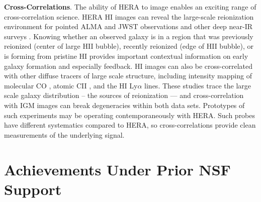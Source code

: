 \documentclass[preprint]{aastex}
\newcommand{\Mycitep}[1]{{\bf \citep{#1}}}
\newcommand{\compress}{\vspace{-0.25in}}
\begin{document}
{\bf Cross-Correlations}. The ability of HERA to image enables an exciting range of cross-correlation science.
HERA HI images can reveal the large-scale reionization environment for pointed ALMA and JWST
observations and other deep near-IR surveys \Mycitep{lidz_et_al2009}.
Knowing whether an observed galaxy is in a region that  was
previously reionized (center of large HII bubble), recently reionized (edge of HII bubble), or is forming from
pristine HI provides important contextual information on early galaxy formation and especially feedback.
HI images can also be cross-correlated with other diffuse
tracers of large scale structure, including intensity
mapping of molecular  CO \Mycitep{lidz_et_al2011}, atomic CII \citep{gong_et_al2011}, and the HI Ly$\alpha$ \citep{silva_et_al2013,wiersma_et_al2013} lines. These studies
trace the large scale galaxy distribution -- the sources of reionization — and cross-correlation 
with IGM images can break degeneracies within both data sets. Prototypes of such experiments
may be operating contemporaneously with HERA. Such probes have different systematics
compared to HERA, so cross-correlations provide clean measurements of the underlying signal.



\compress
\section{Achievements Under Prior NSF Support} %
\end{document}
